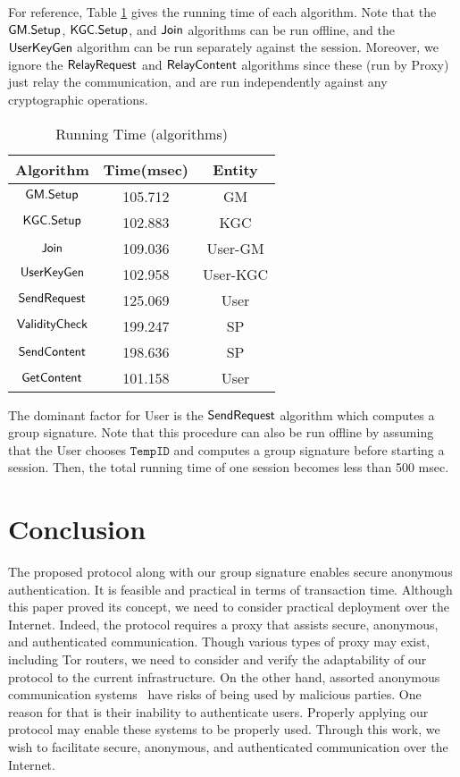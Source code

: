 \documentclass[preprint]{sig-alternate}
\begin{document}
For reference, Table \ref{exp} gives the running time of each algorithm.
Note that the ${\sf GM.Setup}$, ${\sf KGC.Setup}$, and ${\sf Join}$ algorithms can be run offline, and the ${\sf UserKeyGen}$ algorithm can be run separately against the session.
Moreover, we ignore the ${\sf RelayRequest}$ and ${\sf RelayContent}$ algorithms since these (run by Proxy) just relay the communication, and are run independently against any cryptographic operations.

\begin{table}[h]
\begin{center}
\caption{Running Time (algorithms)}\label{exp}
\begin{tabular}{|c|c|c|} 
\hline
Algorithm & Time(msec) & Entity \\ \hline\hline
${\sf GM.Setup}$ & 105.712 &  GM\\ \hline
${\sf KGC.Setup}$ & 102.883 &  KGC\\ \hline
${\sf Join}$ & 109.036 & User-GM\\\hline
${\sf UserKeyGen}$ & 102.958  &  User-KGC\\ \hline
${\sf SendRequest}$ & 125.069  &  User\\ \hline
${\sf ValidityCheck}$ &199.247  &  SP\\ \hline
${\sf SendContent}$  & 198.636 &  SP\\ \hline
${\sf GetContent}$  & 101.158 &  User\\ \hline
\end{tabular}
\end{center}
\end{table}


\noindent 
The dominant factor for User is the ${\sf SendRequest}$ algorithm which computes a group signature. 
Note that this procedure can also be run offline by assuming that the User chooses $\mathtt{TempID}$ and computes a group signature before starting a session. 
Then, the total running time of one session becomes less than 500 msec.

\section{Conclusion}

The proposed protocol along with our group signature enables secure anonymous authentication.
It is feasible and practical in terms of transaction time.
Although this paper proved its concept, we need to consider practical deployment over the Internet.
Indeed, the protocol requires a proxy that assists secure, anonymous, and authenticated communication.
Though various types of proxy may exist, including Tor routers, we need to consider and verify the adaptability of our protocol to the current infrastructure.
On the other hand, assorted anonymous communication systems~\cite{TorProject,oakland2013-parrot,[MoghaddamLDG12]} have risks of being used by malicious parties.
One reason for that is their inability to authenticate users. Properly applying our protocol may enable these systems to be properly used.
Through this work, we wish to facilitate secure, anonymous, and authenticated communication over the Internet.
\end{document}
